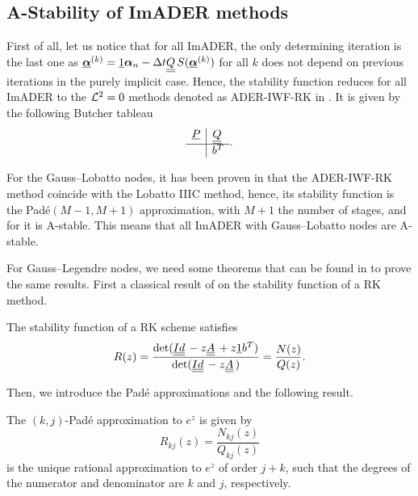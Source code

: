 \subsection{A-Stability of ImADER methods}
\label{subsec:ADER_A-stability}
First of all, let us notice that for all ImADER, the only determining iteration is the last one as $\bbc^{(k)} = \vec{1}\bc_n -\Delta t \mat{Q} S(\bbc^{(k)})$ for all $k$ does not depend on previous iterations in the purely implicit case.
Hence, the stability function reduces for all ImADER to the $\mathcal L^2=0$ methods denoted as ADER-IWF-RK in \cite{veiga2023improving}. It is given by the following Butcher tableau
\begin{equation}
	\begin{array}{c|c}
		\vec{P} & \mat{Q} \\ \hline 
		&b^T 
	\end{array}.
\end{equation}

For the Gauss--Lobatto nodes, it has been proven in \cite[Theorem A.3]{veiga2023improving} that the ADER-IWF-RK method coincide with the Lobatto IIIC method, hence, its stability function is the Pad\'e$(M-1,M+1)$ approximation, with $M+1$ the number of stages, and for \cite[Theorem 4.12]{wanner1996solving} it is A-stable.
This means that all ImADER with Gauss--Lobatto nodes are A-stable.

For Gauss--Legendre nodes, we need some theorems that can be found in \cite{wanner1996solving} to prove the same results. 
First a classical result of \cite{stetter1973analysis,scherer1979necessary} on the stability function of a RK method.
\begin{theorem}
	The stability function of a RK scheme satisfies
	\begin{equation}\label{eq:stability_function_form}
	R(z) = \frac{\det(\mat{Id}-z\mat{A}+z\vec{1} b^T)}{\det(\mat{Id}-z\mat{A})} = \frac{N(z)}{Q(z)}.
	\end{equation}
\end{theorem}

Then, we introduce the Pad\'e approximations and the following result.
\begin{theorem}\label{th:pade_order}
	The $(k,j)$-Pad\'e approximation to $e^z$ is given by
	\begin{equation}
	R_{kj}(z) = \frac{N_{kj}(z)}{Q_{kj}(z)}
	\end{equation}
	is the unique rational approximation to $e^z$ of order $j+k$, such that the degrees of the numerator and denominator are $k$ and $j$, respectively. 
\end{theorem}

